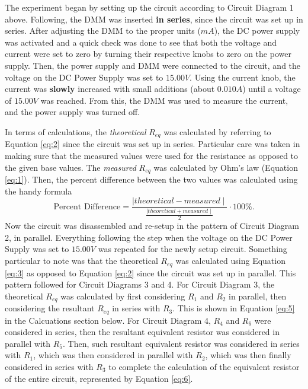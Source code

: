 \documentclass{article}
\theoremstyle{definition}
\begin{document}
    The experiment began by setting up the circuit according to Circuit Diagram 1 above. Following,
    the DMM was inserted \textbf{in series}, since the circuit was set up in series. After adjusting the 
    DMM to the proper units ($mA$), the DC power supply was activated and a quick check was done to see that
    both the voltage and current were set to zero by turning their respective knobs to zero on the power supply.
    Then, the power supply and DMM were connected to the circuit, and the voltage on the DC Power Supply was set to $15.00 V$.
    Using the current knob, the current was \textbf{slowly} increased with small additions (about $0.010 A$) until
    a voltage of $15.00 V$ was reached. From this, the DMM was used to measure the current, and the power supply was turned off.

In terms of calculations, the \textit{theoretical} $R_{eq}$ was calculated by referring to Equation \ref{eq:2} since the circuit
was set up in series. Particular care was taken in making sure that the measured values were used for the resistance
as opposed to the given base values. The \textit{measured} $R_{eq}$ was calculated by Ohm's law (Equation \ref{eq:1}).
Then, the percent difference between the two values was calculated using the handy formula
\begin{equation} \label{eq:4}
    \text{Percent Difference} = \frac{\mid \!theoretical - measured \mid}{\frac{\mid theoretical + measured \mid}{2}} \cdot 100\%.
\end{equation}
Now the circuit was disassembled and re-setup in the pattern of Circuit Diagram 2, in parallel. Everything following the step 
when the voltage on the DC Power Supply was set to $15.00 V$ was repeated for the newly setup circuit. Something particular to note 
was that the theoretical $R_{eq}$ was calculated using Equation \ref{eq:3} as opposed to Equation \ref{eq:2} since
the circuit was set up in parallel. This pattern followed for Circuit Diagrams 3 and 4. For Circuit Diagram 3, 
the theoretical $R_{eq}$ was calculated by first considering $R_1$ and $R_2$ in parallel, then considering the resultant
$R_{eq}$ in series with $R_3$. This is shown in Equation \ref{eq:5} in the Calcuations section below. For Circuit Diagram 4, $R_4$ and $R_6$ were considered in series, then the resultant equivalent resistor
was considered in parallel with $R_5$. Then, such resultant equivalent resistor was considered in series with $R_1$, which was then
considered in parallel with $R_2$, which was then finally considered in series with $R_3$ to complete the calculation of the 
equivalent resistor of the entire circuit, represented by Equation \ref{eq:6}.
\end{document}
